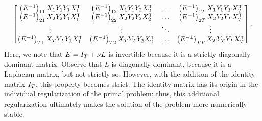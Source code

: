 \begin{equation}
    \label{eq:laplacian_block_linear}
    \begin{bmatrix}
        \left(E^{-1}\right)_{11} X_1 Y_1 Y_1 X_1^\intercal             & \left(E^{-1}\right)_{12} X_1 Y_1 Y_2 X_2^\intercal              & \ldots & \left(E^{-1}\right)_{1\ntasks} X_1 Y_1 Y_\ntasks X_\ntasks^\intercal              \\
        \left(E^{-1}\right)_{21} X_2 Y_2 Y_1  X_1^\intercal             & \left(E^{-1}\right)_{22} X_2 Y_2 Y_2 X_2^\intercal              & \ldots & \left(E^{-1}\right)_{2\ntasks} X_2 Y_2 Y_\ntasks X_\ntasks^\intercal              \\
        \vdots                                                 & \vdots                                                  & \ddots & \vdots                                                              \\
        \left(E^{-1}\right)_{\ntasks1} X_\ntasks Y_\ntasks Y_1 X_1^\intercal & \left(E^{-1}\right)_{\ntasks 2} X_\ntasks Y_\ntasks Y_2 X_2^\intercal & \ldots & \left(E^{-1}\right)_{\ntasks \ntasks} X_\ntasks Y_\ntasks Y_\ntasks X_\ntasks^\intercal \\
    \end{bmatrix} .
\end{equation}
Here, we note that $E = I_T + \nu L$ is invertible because it is a strictly diagonally dominant matrix. Observe that $L$ is diagonally dominant, because it is a Laplacian matrix, but not strictly so. However, with the addition of the identity matrix $I_T$, this property becomes strict. The identity matrix has its origin in the individual regularization of the primal problem; thus, this additional regularization ultimately makes the solution of the problem more numerically stable.

